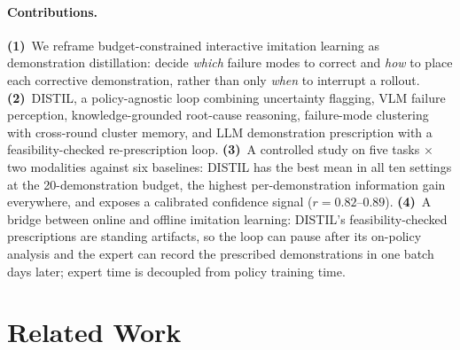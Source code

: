 \documentclass[letterpaper]{article} %
\begin{document}
\paragraph{Contributions.}
\textbf{(1)}~We reframe budget-constrained interactive imitation learning as
demonstration distillation: decide \emph{which} failure modes to correct and
\emph{how} to place each corrective demonstration, rather than only
\emph{when} to interrupt a rollout.
\textbf{(2)}~DISTIL, a policy-agnostic loop combining uncertainty flagging,
VLM failure perception, knowledge-grounded root-cause reasoning,
failure-mode clustering with cross-round cluster memory, and LLM
demonstration prescription with a feasibility-checked re-prescription loop.
\textbf{(3)}~A controlled study on five tasks $\times$ two modalities against
six baselines: DISTIL has the best mean in all ten settings at the
20-demonstration budget, the highest per-demonstration information gain everywhere,
and exposes a calibrated confidence signal ($r=0.82$--$0.89$).
\textbf{(4)}~A bridge between online and offline imitation learning:
DISTIL's feasibility-checked prescriptions are standing artifacts, so the
loop can pause after its on-policy analysis and the expert can record the
prescribed demonstrations in one batch days later; expert time is decoupled
from policy training time.

\section{Related Work}
\label{sec:related}
\end{document}
